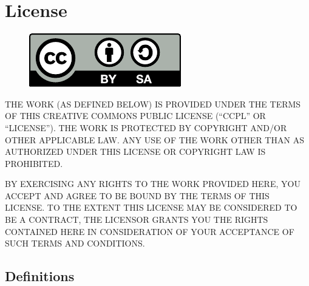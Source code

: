 \chapter{License}
\begin{figure}[h]
\includegraphics{logos/by-sa.pdf}
\end{figure}

THE WORK (AS DEFINED BELOW) IS PROVIDED UNDER THE TERMS
OF THIS CREATIVE COMMONS PUBLIC LICENSE (``CCPL'' OR
``LICENSE''). THE WORK IS PROTECTED BY COPYRIGHT AND/OR OTHER
APPLICABLE LAW. ANY USE OF THE WORK OTHER THAN AS
AUTHORIZED UNDER THIS LICENSE OR COPYRIGHT LAW IS
PROHIBITED.

BY EXERCISING ANY RIGHTS TO THE WORK PROVIDED HERE, YOU
ACCEPT AND AGREE TO BE BOUND BY THE TERMS OF THIS LICENSE.
TO THE EXTENT THIS LICENSE MAY BE CONSIDERED TO BE A
CONTRACT, THE LICENSOR GRANTS YOU THE RIGHTS CONTAINED HERE
IN CONSIDERATION OF YOUR ACCEPTANCE OF SUCH TERMS AND
CONDITIONS.

\section{Definitions}

